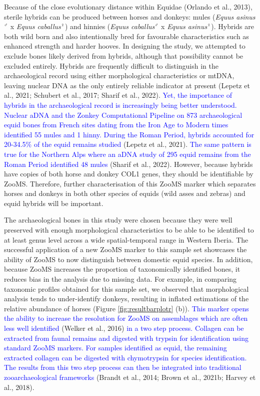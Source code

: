 \documentclass[preprint, 3p, authoryear]{elsarticle} %
\begin{document}
Because of the close evolutionary distance within Equidae (Orlando et al., 2013), sterile hybrids can be produced between horses and donkeys: mules (\emph{Equus asinus}\(^{\male}\) x \emph{Equus caballus}\(^{\female}\)) and hinnies (\emph{Equus caballus}\(^{\male}\) x \emph{Equus asinus}\(^{\female}\)). Hybrids are both wild born and also intentionally bred for favourable characteristics such as enhanced strength and harder hooves. In designing the study, we attempted to exclude bones likely derived from hybrids, although that possibility cannot be excluded entirely. Hybrids are frequently difficult to distinguish in the archaeological record using either morphological characteristics or mtDNA, leaving nuclear DNA as the only entirely reliable indicator at present (Lepetz et al., 2021; Schubert et al., 2017; Sharif et al., 2022). \textcolor{blue}{Yet, the importance of hybrids in the archaeological record is increasingly being better understood. Nuclear aDNA and the Zonkey Computational Pipeline on 873 archaeological equid bones from French sites dating from the Iron Age to Modern times identified 55 mules and 1 hinny. During the Roman Period, hybrids accounted for 20-34.5\% of the equid remains studied} (Lepetz et al., 2021). \textcolor{blue}{The same pattern is true for the Northern Alps where an aDNA study of 295 equid remains from the Roman Period identified 48 mules} (Sharif et al., 2022). However, because hybrids have copies of both horse and donkey COL1 genes, they should be identifiable by ZooMS. Therefore, further characterisation of this ZooMS marker which separates horses and donkeys in both other species of equids (wild asses and zebras) and equid hybrids will be important.

The archaeological bones in this study were chosen because they were well preserved with enough morphological characteristics to be able to be identified to at least genus level across a wide spatial-temporal range in Western Iberia. The successful application of a new ZooMS marker to this sample set showcases the ability of ZooMS to now distinguish between domestic equid species. In addition, because ZooMS increases the proportion of taxonomically identified bones, it reduces bias in the analysis due to missing data. For example, in comparing taxonomic profiles obtained for this sample set, we observed that morphological analysis tends to under-identify donkeys, resulting in inflated estimations of the relative abundance of horses (Figure \ref{fig:resultbarplotr} (b)). \textcolor{blue}{This marker opens the ability to increase the resolution for ZooMS on assemblages which are often less well identified} (Welker et al., 2016) \textcolor{blue}{in a two step process. Collagen can be extracted from faunal remains and digested with trypsin for identification using standard ZooMS markers. For samples identified as equid, the remaining extracted collagen can be digested with chymotrypsin for species identification. The results from this two step process can then be integrated into traditional zooarchaeological frameworks} (Brandt et al., 2014; Brown et al., 2021b; Harvey et al., 2018).
\end{document}
